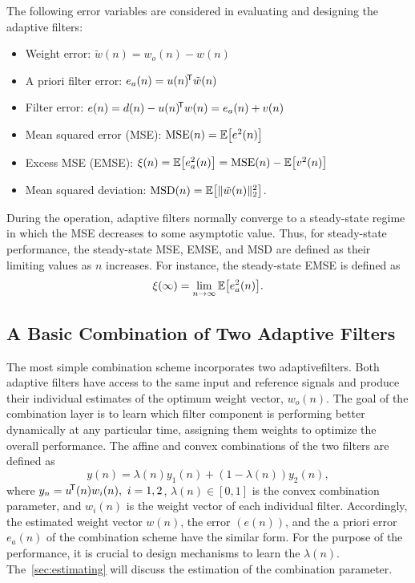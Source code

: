 \documentclass{article}
\begin{document}
The following error variables are considered in evaluating and designing the adaptive filters:
\begin{itemize}
    \item Weight error: $\tilde{w}(n)=w_o(n)-w(n)$
    \item A priori filter error: $e_a(n)=u(n)\!^{\mathsf{T}}\tilde{w}(n)$
    \item Filter error: $e(n)=d(n)-u(n)\!^{\mathsf{T}} w(n)=e_a(n)+v(n)$
    \item Mean squared error (MSE): $\MSE(n)=\E{e^2(n)}$
    \item Excess MSE (EMSE): $\xi(n)=\E{e_a^2(n)}=\MSE(n)-\E{v^2(n)}$
    \item Mean squared deviation: $\MSD(n)=\E{\norm{\tilde{w}(n)}_2^2}$.
\end{itemize}
During the operation, adaptive filters normally converge to a steady-state regime in which the MSE decreases to some asymptotic value. Thus, for steady-state performance, the steady-state MSE, EMSE, and MSD are defined as their limiting values as $n$ increases. For instance, the steady-state EMSE is defined as
\begin{equation}
    \xi(\infty)=\lim_{n\rightarrow\infty}\E{e_a^2(n)}.
\end{equation}

\subsection{A Basic Combination of Two Adaptive Filters}
The most simple combination scheme incorporates two adaptivefilters.
Both adaptive filters have access to the same input and reference signals and produce their individual estimates of the optimum weight vector, $w_o(n)$.
The goal of the combination layer is to learn which filter component is performing better dynamically at any particular time, assigning them weights to optimize the overall performance.
The affine and convex combinations of the two filters are defined as
\begin{equation}\label{eq:affine_combination}
    y(n)=\lambda(n)y_1(n)+(1-\lambda(n))y_2(n),
\end{equation}
where $y_n=u\!^{\mathsf{T}}(n)w_i(n),\ i=1,2$, $\lambda(n) \in [0,1]$ is the convex combination parameter, and $w_i(n)$ is the weight vector of each individual filter. Accordingly, the estimated weight vector $w(n)$, the error $(e(n))$, and the a priori error $e_a(n)$ of the combination scheme have the similar form. For the purpose of the performance, it is crucial to design mechanisms to learn the $\lambda(n)$. The~\cref{sec:estimating} will discuss the estimation of the combination parameter.
\end{document}
